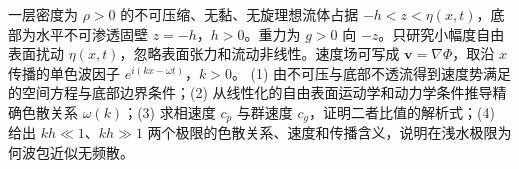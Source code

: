 一层密度为 \(\rho>0\) 的不可压缩、无黏、无旋理想流体占据 \(-h<z<\eta(x,t)\)，底部为水平不可渗透固壁 \(z=-h\)，\(h>0\)。重力为 \(g>0\) 向 \(-z\)。只研究小幅度自由表面扰动 \(\eta(x,t)\)，忽略表面张力和流动非线性。速度场可写成 \(\boldsymbol v=\nabla\Phi\)，取沿 \(x\) 传播的单色波因子 \(e^{i(kx-\omega t)}\)，\(k>0\)。
(1) 由不可压与底部不透流得到速度势满足的空间方程与底部边界条件；(2) 从线性化的自由表面运动学和动力学条件推导精确色散关系 \(\omega(k)\)；(3) 求相速度 \(c_p\) 与群速度 \(c_g\)，证明二者比值的解析式；(4) 给出 \(kh\ll1\)、\(kh\gg1\) 两个极限的色散关系、速度和传播含义，说明在浅水极限为何波包近似无频散。
